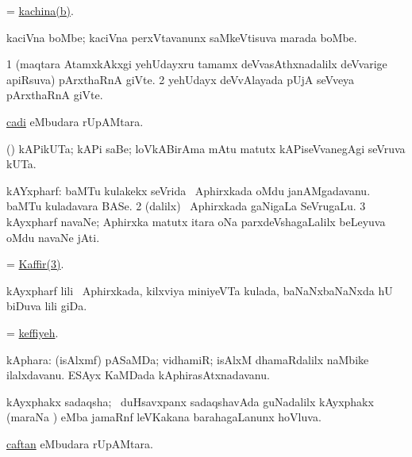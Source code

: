 \bentry
{}
\gl{\nA}
\bmng
 = \hyperlink{kachina(b)}{kachina(b)}. 
\emng
\eentry

\bentry
{}
\gl{\nA}
\bmng
kaciVna boMbe; kaciVna perxVtavanunx saMkeVtisuva marada boMbe. 
\emng
\eentry

\bentry
{}
\gl{\nA}
\bmng
\bnum
\num{1} (maqtara AtamxkAkxgi yehUdayxru tamamx deVvasAthxnadalilx deVvarige apiRsuva) pArxthaRnA giVte. 
\num{2} yehUdayx deVvAlayada pUjA seVveya pArxthaRnA giVte. 
\enum
\emng
\eentry

\bentry
{}
\gl{\nA}
\bmng
\hyperref{kandict_c.pdf}{C}{cadi}{cadi} eMbudara rUpAMtara. 
\emng
\eentry

\bentry
{}
\gl{\nA}
\bmng
(\ame) kAPikUTa; kAPi saBe; loVkABirAma mAtu matutx kAPiseVvanegAgi seVruva kUTa. 
\emng
\eentry

\bentry
{}
\gl{\nA}
\bmng
\bnum
{} kAYxpharf: 
\banum
{} baMTu kulakekx seVrida \da\ Aphirxkada oMdu janAMgadavanu. 
 baMTu kuladavara BASe. 
\eanum
\numie
\num{2} (\bava dalilx) \da\ Aphirxkada gaNigaLa SeVrugaLu. 
\hypertarget{Kaffir(3)}{} 
\num{3} kAyxpharf navaNe; \pU Aphirxka matutx itara oNa parxdeVshagaLalilx beLeyuva oMdu navaNe jAti. 
\enum
\emng
\eentry

\bentry
{}
\gl{\nA}
\bmng
 = \hyperlink{Kaffir(3)}{Kaffir(3)}. 
\emng
\eentry

\bentry
{}
\gl{\nA}
\bmng
kAyxpharf lili \da\ Aphirxkada, kilxviya miniyeVTa kulada, baNaNxbaNaNxda hU biDuva lili giDa. 
\emng
\eentry

\bentry
{}
\gl{\nA}
\bmng
 = \hyperlink{keffiyeh}{keffiyeh}. 
\emng
\eentry

\bentry
{}
\gl{\nA}
\bmng
kAphara: 
\banum
{} (isAlxmf) pASaMDa; vidhamiR; isAlxM dhamaRdalilx naMbike ilalxdavanu. 
 ESAyx KaMDada kAphirasAtxnadavanu. 
\eanum
\emng
\eentry

\bentry
{}
\gl{\gu}
\bmng
kAyxphakx sadaqsha; \kanmu\ duHsavxpanx sadaqshavAda guNadalilx kAyxphakx (maraNa ) eMba jamaRnf leVKakana barahagaLanunx hoVluva. 
\emng
\eentry

\bentry
{}
\gl{\nA}
\bmng
\hyperref{kandict_c.pdf}{C}{caftan}{caftan} eMbudara rUpAMtara. 
\emng
\eentry

